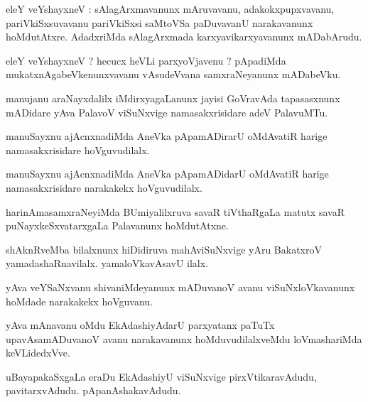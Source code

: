 \documentclass{article}
\begin{document}
\begin{mn}
eleY veYshayxneV : sAlagArxmavanunx mAruvavanu, adakokxpupxvavanu, pariVkiSxsuvavanu pariVkiSxsi 
saMtoVSa paDuvavanU narakavanunx hoMdutAtxre. AdadxriMda sAlagArxmada karxyavikarxyavanunx 
mADabArudu.
\end{mn}

\begin{mn}
eleY veYshayxneV ? hecucx heVLi parxyoVjavenu ?  pApadiMda mukatxnAgabeVkenunxvavanu vAsudeVvana 
samxraNeyanunx  mADabeVku.
\end{mn}


\begin{mn}
manujanu araNayxdalilx iMdirxyagaLanunx jayisi GoVravAda tapasasxnunx mADidare yAva PalavoV 
viSuNxvige namasakxrisidare adeV PalavuMTu.
\end{mn}

\begin{mn}
manuSayxnu ajAcnxnadiMda AneVka pApamADirarU oMdAvatiR harige namasakxrisidare hoVguvudilalx.
\end{mn}

\begin{mn}
manuSayxnu ajAcnxnadiMda AneVka pApamADidarU oMdAvatiR harige namasakxrisidare narakakekx 
hoVguvudilalx.
\end{mn}

\begin{mn}
harinAmasamxraNeyiMda BUmiyalilxruva savaR tiVthaRgaLa matutx savaR puNayxkeSxvatarxgaLa Palavanunx 
hoMdutAtxne.
\end{mn}

\begin{mn}
shAknRveMba bilalxnunx hiDidiruva mahAviSuNxvige yAru BakatxroV yamadashaRnavilalx. 
yamaloVkavAsavU ilalx.
\end{mn}

\begin{mn}
yAva veYSaNxvanu shivaniMdeyanunx mADuvanoV avanu viSuNxloVkavanunx hoMdade narakakekx hoVguvanu.
\end{mn}

\begin{mn}
yAva mAnavanu oMdu EkAdashiyAdarU parxyatanx paTuTx upavAsamADuvanoV avanu narakavanunx 
hoMduvudilalxveMdu loVmashariMda keVLidedxVve. 
\end{mn}

\begin{mn}
uBayapakaSxgaLa eraDu EkAdashiyU viSuNxvige pirxVtikaravAdudu, pavitarxvAdudu. pApanAshakavAdudu.
\end{mn}
\end{document}
